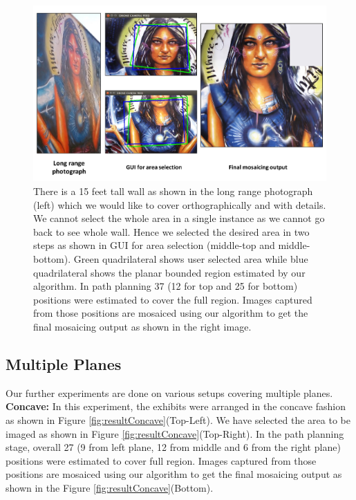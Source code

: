 \begin{figure}
\centering
\includegraphics[width=\linewidth]{figures/multiplanar/ladyResult.pdf}
\caption[Result: Single planar scene]{There is a 15 feet tall wall as shown in
the long range photograph (left) which we would like to cover orthographically and with details. We cannot
select the whole area in a single instance as we cannot go back to see whole
wall. Hence we selected the desired area in two steps as shown in GUI for area
selection (middle-top and middle-bottom). Green quadrilateral shows user selected area
while blue quadrilateral shows the planar bounded region estimated by our
algorithm. In path planning 37 (12 for top and 25 for bottom) positions were
estimated to cover the full region. Images captured from those positions are
mosaiced using our algorithm to get the final mosaicing output as shown in the
right image.}
\label{fig:resultLady}
\end{figure}

\subsection{Multiple Planes}
Our further experiments are done on various setups covering multiple planes.\\

\textbf{Concave:} In this experiment, the exhibits were arranged in the concave
fashion as shown in Figure \ref{fig:resultConcave}(Top-Left). We have selected
the area to be imaged as shown in Figure \ref{fig:resultConcave}(Top-Right). In
the path planning stage, overall 27 (9 from left plane, 12 from middle and 6
from the right plane) positions were estimated to cover full region. Images captured
from those positions are mosaiced using our algorithm to get the final mosaicing
output as shown in the Figure \ref{fig:resultConcave}(Bottom).

